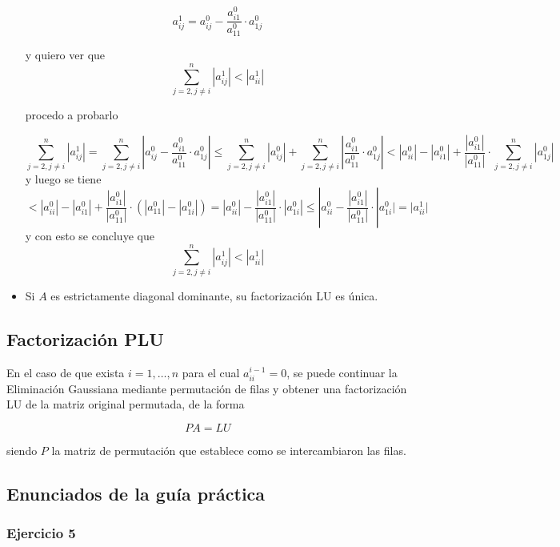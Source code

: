 \begin{itemize}
    \[a_{ij}^{1} = a_{ij}^{0} - \frac{a_{i1}^{0}}{a_{11}^{0}}\cdot a_{1j}^{0}\]
    
    y quiero ver que 
    \[\sum_{j = 2, j \neq i}^{n} |a_{ij}^{1}| < |a_{ii}^{1}|\]
    
    procedo a probarlo
    
    \[\sum_{j = 2, j \neq i}^{n} |a_{ij}^{1}| =  \sum_{j=2,j \neq i}^{n}|a_{ij}^{0} - \frac{a_{i1}^{0}}{a_{11}^{0}}\cdot a_{1j}^{0}| \leq \sum_{j=2,j \neq i}^{n}|a_{ij}^{0}| + \sum_{j=2,j \neq i}^{n} |\frac{a_{i1}^{0}}{a_{11}^{0}}\cdot a_{1j}^{0}| < |a_{ii}^{0}|-|a_{i1}^{0}| + \frac{|a_{i1}^{0}|}{|a_{11}^{0}|}\cdot\sum_{j=2, j \neq i}^{n}|a_{1j}^{0}|\]
    y luego se tiene 
    \[< |a_{ii}^{0}|-|a_{i1}^{0}| + \frac{|a_{i1}^{0}|}{|a_{11}^{0}|}\cdot (|a_{11}^{0}| - |a_{1i}^{0}|) = |a_{ii}^{0}| - \frac{|a_{i1}^{0}|}{|a_{11}^{0}|}\cdot |a_{1i}^{0}| \leq |a_{ii}^{0} - \frac{|a_{i1}^{0}|}{|a_{11}^{0}|}\cdot |a_{1i}^{0}| = |a_{ii}^{1}|\]
    y con esto se concluye que
    \[\sum_{j = 2, j \neq i}^{n} |a_{ij}^{1}| < |a_{ii}^{1}|\]
    \item Si $A$ es estrictamente diagonal dominante, su factorización LU es única.
\end{itemize}

\subsection{Factorización PLU}
\label{subsec:factorizacion_plu}

En el caso de que exista $i = 1,\ldots,n$ para el cual $a_{ii}^{i-1} = 0$, se puede continuar la Eliminación Gaussiana mediante permutación de filas y obtener una factorización LU de la matriz original permutada, de la forma 

\[PA = LU\]

siendo $P$ la matriz de permutación que establece como se intercambiaron las filas.

\subsection{Enunciados de la guía práctica}
\label{subsec:enunciados_guia_2}

\subsubsection{Ejercicio 5}
\label{subsubsec:guia_2_ej_5}

